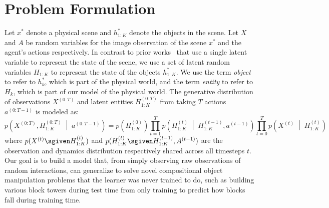 \section{Problem Formulation} \label{sec:problem_formulation}
Let $x^*$ denote a physical scene and $h^*_{1:K}$ denote the objects in the scene.
Let $X$ and $A$ be random variables for the image observation of the scene $x^*$ and the agent's actions respectively.
In contrast to prior works~\citep{hafner2018learning} that use a single latent variable to represent the state of the scene, we use a set of latent random variables $H_{1:K}$ to represent the state of the objects $h^*_{1:K}$.
We use the term \textit{object} to refer to $h^*_k$, which is part of the physical world, and the term \textit{entity} to refer to $H_k$, which is part of our model of the physical world.
The generative distribution of observations $X^{(0:T)}$ and latent entities $H^{(0:T)}_{1:K}$ from taking $T$ actions $a^{(0:T-1)}$ is modeled as:
\footnotesize
\begin{equation} \label{eqn:generative}
    p\left(X^{(0:T)}, H^{(0:T)}_{1:K} \;\middle|\; a^{(0:T-1)}\right) = p\left(H^{(0)}_{1:K}\right) \prod_{t=1}^{T} p\left(H^{(t)}_{1:K} \;\middle|\; H^{(t-1)}_{1:K}, a^{(t-1)}\right) \prod_{t=0}^{T} p\left(X^{(t)} \;\middle|\; H^{(t)}_{1:K}\right)
\end{equation}
\normalsize
where $p(X^{(t)} \sgiven H^{(t)}_{1:K})$ and $p(H^{(t)}_{1:K} \sgiven H^{(t-1)}_{1:K}, A^{(t-1)})$ are the observation and dynamics distribution respectively shared across all timesteps $t$.
Our goal is to build a model that, from simply observing raw observations of random interactions, can generalize to solve novel compositional object manipulation problems that the learner was never trained to do, such as building various block towers during test time from only training to predict how blocks fall during training time.


